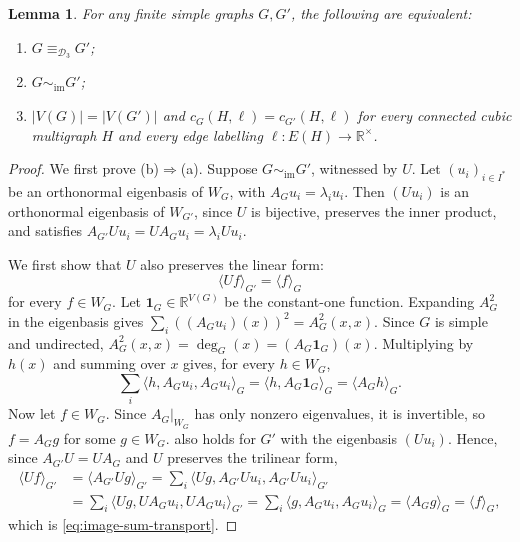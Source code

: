 \documentclass[10pt,a4paper]{article}
\theoremstyle{plain}
\newtheorem{lemma}[theorem]{Lemma}
\theoremstyle{definition}
\newcommand{\R}{\mathbb{R}}
\newcommand{\ones}{\mathbf{1}}
\begin{document}
\begin{lemma}\label{lem:characterisation}
 For any finite simple graphs $G,G'$, the following are equivalent:
 \begin{enumerate}
 \item[(a)] $G\equiv_{\mathcal D_3}G'$;
 \item[(b)] $G\sim_{\mathrm{im}}G'$;
 \item[(c)] $|V(G)|=|V(G')|$ and $c_G(H,\ell)=c_{G'}(H,\ell)$ for every
 connected cubic multigraph $H$ and every edge labelling
 $\ell:E(H)\to\R^\times$.
 \end{enumerate}
\end{lemma}
\begin{proof}
We first prove (b)$\Rightarrow$(a).
Suppose $G\sim_{\mathrm{im}}G'$, witnessed by $U$.
Let $(u_i)_{i\in I^*}$ be an orthonormal eigenbasis of $W_G$, with
$A_Gu_i=\lambda_i u_i$. Then $(Uu_i)$ is an orthonormal eigenbasis of
$W_{G'}$, since $U$ is bijective, preserves the inner product, and
satisfies $A_{G'}Uu_i=UA_Gu_i=\lambda_i Uu_i$.

We first show that $U$ also preserves the linear form:
\begin{equation}\label{eq:image-sum-transport}
 \langle Uf\rangle_{G'}=\langle f\rangle_G
\end{equation}
for every $f\in W_G$.
Let $\ones_G\in\R^{V(G)}$ be the constant-one function.
Expanding $A_G^2$ in the eigenbasis gives
$\sum_i ((A_Gu_i)(x))^2=A_G^2(x,x)$.
Since $G$ is simple and undirected,
$A_G^2(x,x)=\deg_G(x)=(A_G\ones_G)(x)$.
Multiplying by $h(x)$ and summing over $x$ gives, for every $h\in W_G$,
\begin{equation}\label{eq:image-linear}
 \sum_i\langle h,A_Gu_i,A_Gu_i\rangle_G
 =\langle h,A_G\ones_G\rangle_G
 =\langle A_Gh\rangle_G.
\end{equation}
Now let $f\in W_G$. Since $A_G|_{W_G}$ has only nonzero eigenvalues,
it is invertible, so $f=A_Gg$ for some $g\in W_G$.
 also holds for $G'$ with the eigenbasis
$(Uu_i)$. Hence, since $A_{G'}U=UA_G$ and $U$ preserves the trilinear
form,
\begin{equation}\label{eq:commentary-linear-transport}
 \begin{aligned}
 \langle Uf\rangle_{G'}
 &=\langle A_{G'}Ug\rangle_{G'}
 =\sum_i\langle Ug,A_{G'}Uu_i,A_{G'}Uu_i\rangle_{G'}\\
 &=\sum_i\langle Ug,UA_Gu_i,UA_Gu_i\rangle_{G'}
 =\sum_i\langle g,A_Gu_i,A_Gu_i\rangle_G
 =\langle A_Gg\rangle_G
 =\langle f\rangle_G,
 \end{aligned}
\end{equation}
which is \cref{eq:image-sum-transport}.


\end{proof}
\end{document}
